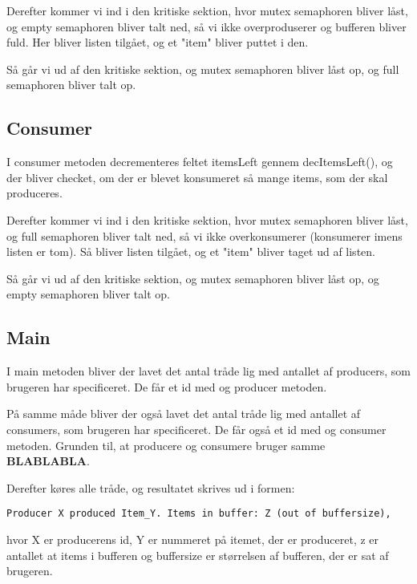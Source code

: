 Derefter kommer vi ind i den kritiske sektion, hvor mutex semaphoren bliver låst, og empty semaphoren bliver talt ned, så vi ikke overproduserer og bufferen bliver fuld. Her bliver listen tilgået, og et "item" bliver puttet i den.

Så går vi ud af den kritiske sektion, og mutex semaphoren bliver låst op, og full semaphoren bliver talt op.

\subsection{Consumer}
I consumer metoden decrementeres feltet itemsLeft gennem decItemsLeft(), og der bliver checket, om der er blevet konsumeret så mange items, som der skal produceres.

Derefter kommer vi ind i den kritiske sektion, hvor mutex semaphoren bliver låst, og full semaphoren bliver talt ned, så vi ikke overkonsumerer (konsumerer imens listen er tom). Så bliver listen tilgået, og et "item" bliver taget ud af listen.

Så går vi ud af den kritiske sektion, og mutex semaphoren bliver låst op, og empty semaphoren bliver talt op.

\subsection{Main}
I main metoden bliver der lavet det antal tråde lig med antallet af producers, som brugeren har specificeret. De får et id med og producer metoden.

På samme måde bliver der også lavet det antal tråde lig med antallet af consumers, som brugeren har specificeret. De får også et id med og consumer metoden. Grunden til, at producere og consumere bruger samme \textbf{BLABLABLA}.

Derefter køres alle tråde, og resultatet skrives ud i formen:
\begin{verbatim}
Producer X produced Item_Y. Items in buffer: Z (out of buffersize),
\end{verbatim}
hvor X er producerens id, Y er nummeret på itemet, der er produceret, z er antallet at items i bufferen og buffersize er størrelsen af bufferen, der er sat af brugeren.
